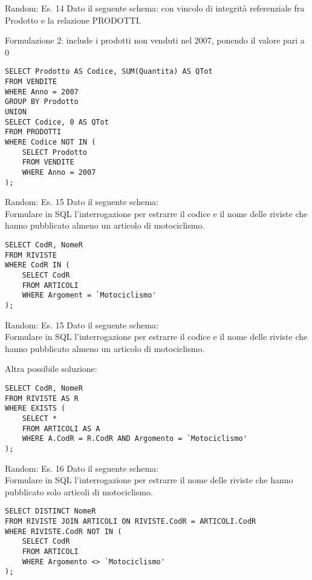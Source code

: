 %
\begin{frame}[fragile]{Random: Es. 14}
\vspace{-.7cm}
Dato il seguente schema:
\schemaProdottiVendite
con vincolo di integrit\`a referenziale fra Prodotto e la relazione PRODOTTI.

\pause
Formulazione 2: include i prodotti non venduti nel 2007, ponendo il valore pari a 0
\begin{lstlisting}   
SELECT Prodotto AS Codice, SUM(Quantita) AS QTot
FROM VENDITE
WHERE Anno = 2007
GROUP BY Prodotto
UNION
SELECT Codice, 0 AS QTot
FROM PRODOTTI
WHERE Codice NOT IN (
    SELECT Prodotto
    FROM VENDITE
    WHERE Anno = 2007
);
\end{lstlisting}
\end{frame}
%
\begin{frame}[fragile]{Random: Es. 15}
Dato il seguente schema:
\schemaRivisteArticoli
\newline
\\Formulare in SQL l'interrogazione per estrarre il codice e il nome delle riviste che hanno pubblicato almeno un articolo di motociclismo.
\pause

\begin{lstlisting}   
SELECT CodR, NomeR
FROM RIVISTE
WHERE CodR IN (
    SELECT CodR
    FROM ARTICOLI
    WHERE Argoment = `Motociclismo'
);
\end{lstlisting}
\end{frame}
%
\begin{frame}[fragile]{Random: Es. 15}
Dato il seguente schema:
\schemaRivisteArticoli
\newline
\\Formulare in SQL l'interrogazione per estrarre il codice e il nome delle riviste che hanno pubblicato almeno un articolo di motociclismo.

Altra possibile soluzione:
\begin{lstlisting}   
SELECT CodR, NomeR
FROM RIVISTE AS R
WHERE EXISTS (
    SELECT *
    FROM ARTICOLI AS A
    WHERE A.CodR = R.CodR AND Argomento = `Motociclismo'
);   
\end{lstlisting}
\end{frame}
%
\begin{frame}[fragile]{Random: Es. 16}
Dato il seguente schema:
\schemaRivisteArticoli
\newline
\\Formulare in SQL l'interrogazione per estrarre il nome delle riviste che hanno pubblicato solo articoli di motociclismo.
\pause

\begin{lstlisting}   
SELECT DISTINCT NomeR
FROM RIVISTE JOIN ARTICOLI ON RIVISTE.CodR = ARTICOLI.CodR
WHERE RIVISTE.CodR NOT IN (
    SELECT CodR
    FROM ARTICOLI
    WHERE Argomento <> `Motociclismo'
);   
\end{lstlisting}
\end{frame}
